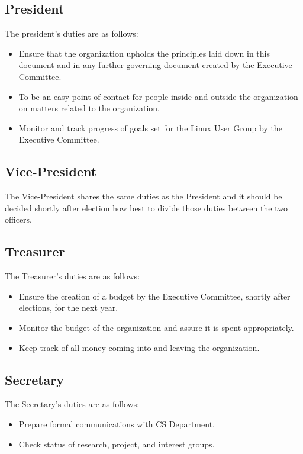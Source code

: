 \documentclass[letter]{report}
\begin{document}
\subsection{President}
The president's duties are as follows:
\begin{itemize}
	\item Ensure that the organization upholds the principles laid down in
	      this document and in any further governing document created by
	      the Executive Committee.
	\item To be an easy point of contact for people inside and outside the
	      organization on matters related to the organization.
	\item Monitor and track progress of goals set for the Linux User Group
	      by the Executive Committee.
\end{itemize}

\subsection{Vice-President}
The Vice-President shares the same duties as the President and it should be
decided shortly after election how best to divide those duties between the two
officers.

\subsection{Treasurer}
The Treasurer's duties are as follows:
\begin{itemize}
	\item Ensure the creation of a budget by the Executive Committee,
	      shortly after elections, for the next year.
	\item Monitor the budget of the organization and assure it is spent
	      appropriately.
	\item Keep track of all money coming into and leaving the organization.
\end{itemize}

\subsection{Secretary}
The Secretary's duties are as follows:
\begin{itemize}
	\item Prepare formal communications with CS Department.
	\item Check status of research, project, and interest groups.
\end{itemize}
\end{document}
